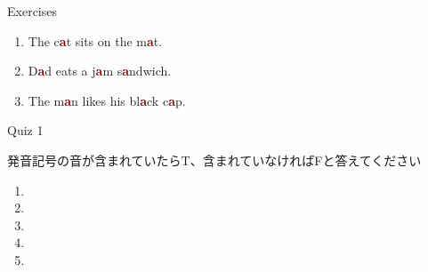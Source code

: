 \documentclass[aspectratio=169,xcolor={dvipsnames,table}]{beamer}
\begin{document}
\begin{frame}[plain]{Exercises \textipa{/\ae /}}
\LARGE
\hypertarget{ex}{}


\begin{enumerate}
 \item The c\textcolor{Maroon}{\bfseries a}t sits on the m\textcolor{Maroon}{\bfseries a}t.
 \item D\textcolor{Maroon}{\bfseries a}d eats a j\textcolor{Maroon}{\bfseries a}m s\textcolor{Maroon}{\bfseries a}ndwich.
 \item The m\textcolor{Maroon}{\bfseries a}n likes his bl\textcolor{Maroon}{\bfseries a}ck c\textcolor{Maroon}{\bfseries a}p.
\end{enumerate}

\hfill{\scriptsize {}}


\end{frame}
\begin{frame}[plain]{Quiz 1}

 発音記号\textipa{/\ae /}の音が含まれていたらT、含まれていなければFと答えてください

\LARGE
\begin{enumerate}
 \item \mbox{}\hspace{40pt}\hspace{200pt}\mbox{}
 \item \mbox{}\hspace{40pt}\hspace{200pt}\mbox{}
 \item \mbox{}\hspace{40pt}\hspace{200pt}\mbox{}
 \item \mbox{}\hspace{40pt}\hspace{200pt}\mbox{}
 \item \mbox{}\hspace{40pt}\hspace{200pt}\mbox{}
\end{enumerate}

\hfill{\scriptsize {}}

\end{frame}
\end{document}
